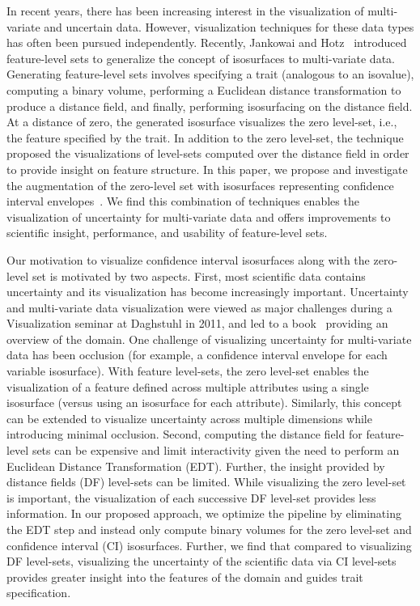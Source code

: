 In recent years, there has been increasing interest in the visualization of multi-variate and uncertain data.
%
However, visualization techniques for these data types has often been pursued independently.
%
Recently, Jankowai and Hotz~\cite{jankowai2020feature} introduced feature-level sets to generalize the concept of isosurfaces to multi-variate data.
%
Generating feature-level sets involves specifying a trait (analogous to an isovalue), computing a binary volume, performing a Euclidean distance transformation to produce a distance field, and finally, performing isosurfacing on the distance field.
%
At a distance of zero, the generated isosurface visualizes the zero level-set, i.e., the feature specified by the trait.
%
In addition to the zero level-set, the technique proposed the visualizations of level-sets computed over the distance field in order to provide insight on feature structure.
%
In this paper, we propose and investigate the augmentation of the zero-level set with isosurfaces representing confidence interval envelopes~\cite{zehner2010visualization}.
%
We find this combination of techniques enables the visualization of uncertainty for multi-variate data and offers improvements to scientific insight, performance, and usability of feature-level sets.

Our motivation to visualize confidence interval isosurfaces along with the zero-level set is motivated by two aspects.
%
First, most scientific data contains uncertainty and its visualization has become increasingly important.
%
Uncertainty and multi-variate data visualization were viewed as major challenges during a Visualization seminar at Daghstuhl in 2011, and led to a book~\cite{hansen2014scientific} providing an overview of the domain. 
%
One challenge of visualizing uncertainty for multi-variate data has been occlusion (for example, a confidence interval envelope for each variable isosurface).
%
With feature level-sets, the zero level-set enables the visualization of a feature defined across multiple attributes using a single isosurface (versus using an isosurface for each attribute).
%
Similarly, this concept can be extended to visualize uncertainty across multiple dimensions while introducing minimal occlusion. 
%
Second, computing the distance field for feature-level sets can be expensive and limit interactivity given the need to perform an Euclidean Distance Transformation (EDT).
%
Further, the insight provided by distance fields (DF) level-sets can be limited.
%
While visualizing the zero level-set is important, the visualization of each successive DF level-set provides less information.
%
In our proposed approach, we optimize the pipeline by eliminating the EDT step and instead only compute binary volumes for the zero level-set and confidence interval (CI) isosurfaces.
%
Further, we find that compared to visualizing DF level-sets, visualizing the uncertainty of the scientific data via CI level-sets provides greater insight into the features of the domain and guides trait specification.
%

